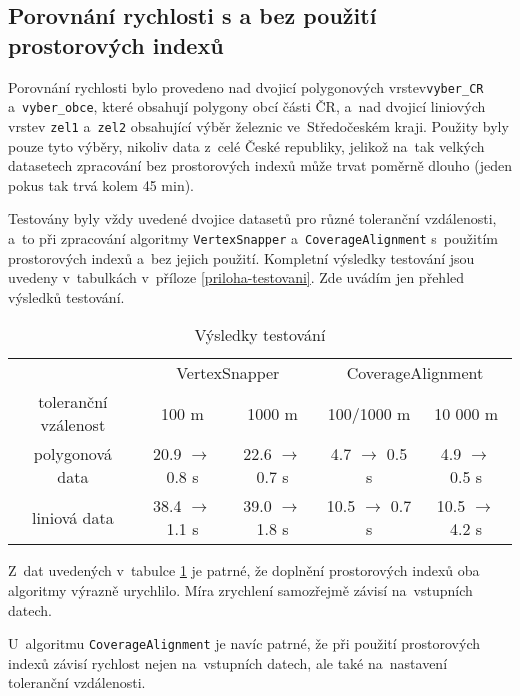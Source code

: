 \subsection{Porovnání rychlosti s a bez použití prostorových indexů}
\label{problemy-test}
Porovnání rychlosti bylo provedeno nad dvojicí polygonových vrstev\linebreak[5] 
\texttt{vyber\_CR} a~\texttt{vyber\_obce}, které obsahují polygony obcí části 
ČR, a~nad dvojicí li\-niových vrstev \texttt{zel1} a~\texttt{zel2} obsahující 
výběr železnic ve~Středočeském kraji. Použity byly pouze tyto výběry, nikoliv 
data z~celé České republiky, jelikož na~tak velkých datasetech zpracování 
bez prostorových indexů může trvat poměrně dlouho (jeden pokus tak trvá 
kolem 45 min).

Testovány byly vždy uvedené dvojice datasetů pro různé toleranční vzdálenosti,
a~to při zpracování algoritmy \texttt{Vertex\-Snapper} a~\texttt{Coverage\-Alignment}
s~použitím prostorových indexů a~bez jejich použití. Kompletní výsledky testování 
jsou uvedeny v~tabulkách v~příloze \ref{priloha-testovani}. Zde uvádím jen přehled 
výsledků testování.

\begin{table}[H]
 \centering
\begin{tabular}{|c|cc|cc|}
\hline
  & \multicolumn{2}{|c}{VertexSnapper} & \multicolumn{2}{|c|}{CoverageAlignment} \\
 toleranční vzálenost & 100 m & 1000 m & 100/1000 m & 10 000 m \\
\hline
\hline
 polygonová data & 20.9 $\rightarrow$ 0.8 s& 22.6 $\rightarrow$ 0.7 s& 
 4.7 $\rightarrow$ 0.5 s& 4.9 $\rightarrow$ 0.5 s\\
 liniová data & 38.4 $\rightarrow$ 1.1 s& 39.0 $\rightarrow$ 1.8 s& 
 10.5 $\rightarrow$ 0.7 s& 10.5 $\rightarrow$ 4.2 s\\
\hline
\end{tabular}
  \caption{Výsledky testování}
  \label{tab:vysledky}
\end{table}


Z~dat uvedených v~tabulce \ref{tab:vysledky} je patrné, že doplnění 
prostorových indexů oba algoritmy výrazně urychlilo. Míra zrychlení 
samozřejmě závisí na~vstupních datech.

U~algoritmu \texttt{Coverage\-Alignment} je navíc patrné,
že při použití prostorových indexů závisí rychlost nejen
na~vstupních datech, ale také na~nastavení toleranční 
vzdálenosti. %

